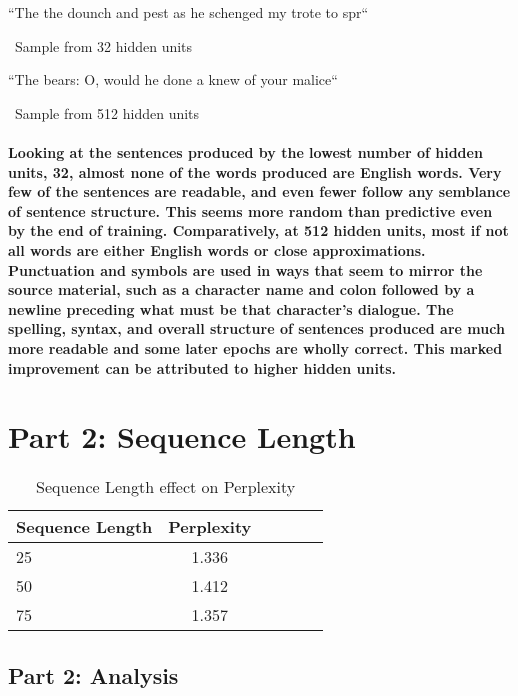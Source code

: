 \documentclass[10pt,a4paper]{report}
\begin{document}
``The the dounch and pest as he schenged my trote to spr``

\ 
Sample from 32 hidden units 
\vspace{5mm}

``The bears: O, would he done a knew of your malice``

\ 
Sample from 512 hidden units 
\

\paragraph{
Looking at the sentences produced by the lowest number of hidden units, 32, almost none of the words produced are English words. Very few of the sentences are readable, and even fewer follow any semblance of sentence structure. This seems more random than predictive even by the end of training. Comparatively, at 512 hidden units, most if not all words are either English words or close approximations. Punctuation and symbols are used in ways that seem to mirror the source material, such as a character name and colon followed by a newline preceding what must be that character's dialogue. The spelling, syntax, and overall structure of sentences produced are much more readable and some later epochs are wholly correct. This marked improvement can be attributed to higher hidden units.
}

\clearpage

\section{Part 2: Sequence Length}

\begin{table}[h]
 \caption{Sequence Length effect on Perplexity}
 \label{tbl:bTable}
 \begin{center}
  \begin{tabular}{lccrrr}
    \hline 
	Sequence Length & Perplexity\\
	\hline
	25 & 1.336\\
	50 & 1.412\\
	75 & 1.357\\
  \end{tabular}
 \end{center}
\end{table}

\subsection{Part 2: Analysis}
\end{document}
